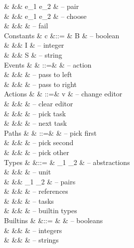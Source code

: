 \begin{grammar}
    &        &\mid& e_1 \And e_2                & – pair \\
    &        &\mid& e_1 \Or e_2                 & – choose \\
    &        &\mid& \Fail                       & – fail \\
  Constants
    & c      &::= & B \in \BB                   & – boolean \\
    &        &\mid& I \in \ZZ                   & – integer \\
    &        &\mid& S \in \SS                   & – string \\
  \addlinespace
  Events
    & \eta   & ::=& \alpha                      & – action \\
    &        &\mid& \Left \eta                  & – pass to left \\
    &        &\mid& \Right \eta                 & – pass to right \\
  Actions
    & \alpha & ::=& v                           & – change editor \\
    &        &\mid& \Clear                      & – clear editor \\
    &        &\mid& \Pick \pi                   & – pick task \\
    &        &\mid& \Next                       & – next task \\
  Paths
    & \pi    & ::=& \First                      & – pick first \\
    &        &\mid& \Second                     & – pick second \\
    &        &\mid& \Other \pi                  & – pick other \\
  \addlinespace
  Types
    & \tau   &::= & \tau_1 \to \tau_2           & – abstractions \\
    &        &\mid& \Unit                       & – unit \\
    &        &\mid& \tau_1 \times \tau_2        & – pairs \\
    &        &\mid& \Reference \tau             & – references \\
    &        &\mid& \Task \tau                  & – tasks \\
    &        &\mid& \beta                       & – builtin types \\
  Builtins
    & \beta  &::= & \Bool                       & – booleans \\
    &        &\mid& \Int                        & – integers \\
    &        &\mid& \String                     & – strings \\
\end{grammar}


